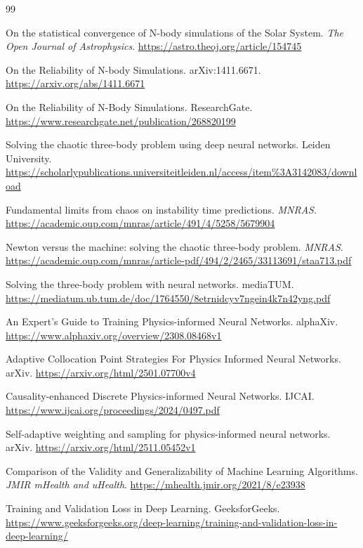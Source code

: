 \begin{thebibliography}{99}

 On the statistical convergence of N-body simulations of the Solar System. \textit{The Open Journal of Astrophysics}. \url{https://astro.theoj.org/article/154745}

 On the Reliability of N-body Simulations. arXiv:1411.6671. \url{https://arxiv.org/abs/1411.6671}

 On the Reliability of N-Body Simulations. ResearchGate. \url{https://www.researchgate.net/publication/268820199}

 Solving the chaotic three-body problem using deep neural networks. Leiden University. \url{https://scholarlypublications.universiteitleiden.nl/access/item%3A3142083/download}

 Fundamental limits from chaos on instability time predictions. \textit{MNRAS}. \url{https://academic.oup.com/mnras/article/491/4/5258/5679904}

 Newton versus the machine: solving the chaotic three-body problem. \textit{MNRAS}. \url{https://academic.oup.com/mnras/article-pdf/494/2/2465/33113691/staa713.pdf}

 Solving the three-body problem with neural networks. mediaTUM. \url{https://mediatum.ub.tum.de/doc/1764550/8etrnidcyv7ngein4k7n42yng.pdf}

 An Expert's Guide to Training Physics-informed Neural Networks. alphaXiv. \url{https://www.alphaxiv.org/overview/2308.08468v1}

 Adaptive Collocation Point Strategies For Physics Informed Neural Networks. arXiv. \url{https://arxiv.org/html/2501.07700v4}

 Causality-enhanced Discrete Physics-informed Neural Networks. IJCAI. \url{https://www.ijcai.org/proceedings/2024/0497.pdf}

 Self-adaptive weighting and sampling for physics-informed neural networks. arXiv. \url{https://arxiv.org/html/2511.05452v1}

 Comparison of the Validity and Generalizability of Machine Learning Algorithms. \textit{JMIR mHealth and uHealth}. \url{https://mhealth.jmir.org/2021/8/e23938}

 Training and Validation Loss in Deep Learning. GeeksforGeeks. \url{https://www.geeksforgeeks.org/deep-learning/training-and-validation-loss-in-deep-learning/}


\end{thebibliography}

